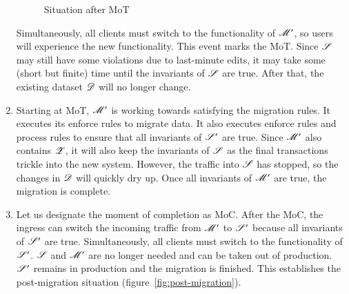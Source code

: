 \documentclass{elsarticle}
\begin{document}
\begin{enumerate}
\begin{figure}[h]
   \caption{Situation after MoT}
   \label{fig:during}
\end{figure}
      Simultaneously, all clients must switch to the functionality of $\mathscr{M}'$,
      so users will experience the new functionality.
      This event marks the MoT.
      Since $\mathscr{S}$ may still have some violations due to last-minute edits,
      it may take some (short but finite) time until the invariants of $\mathscr{S}$ are true.
      After that, the existing dataset $\mathscr{D}$ will no longer change.
\item Starting at MoT, $\mathscr{M}'$ is working towards satisfying the migration rules.
      It executes its enforce rules to migrate data.
      It also executes enforce rules and process rules to ensure that all invariants of $\mathscr{S}'$ are true.
      Since $\mathscr{M}'$ also contains $\mathscr{Z}$,
      it will also keep the invariants of $\mathscr{S}$ as the final transactions trickle into the new system.
      However, the traffic into $\mathscr{S}$ has stopped, so the changes in $\mathscr{D}$ will quickly dry up.
      Once all invariants of $\mathscr{M}'$ are true, the migration is complete.
\item Let us designate the moment of completion as MoC.
      After the MoC, the ingress can switch the incoming traffic from $\mathscr{M}'$ to $\mathscr{S}'$ because all invariants of $\mathscr{S}'$ are true.
      Simultaneously, all clients must switch to the functionality of $\mathscr{S}'$.
      $\mathscr{S}$ and $\mathscr{M}'$ are no longer needed and can be taken out of production.
      $\mathscr{S}'$ remains in production and the migration is finished.
      This establishes the post-migration situation (figure~\ref{fig:post-migration}).
\end{enumerate}
\end{document}
